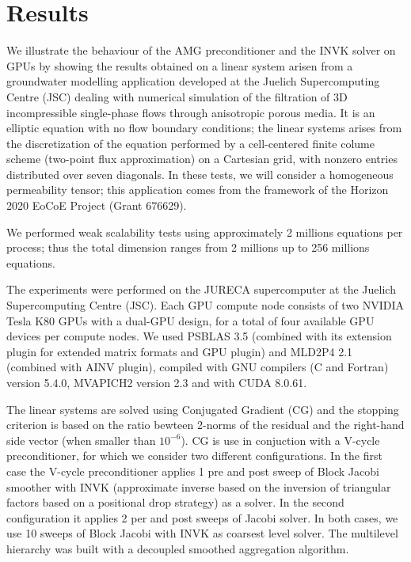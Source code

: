 \section{Results}

We illustrate the behaviour of the AMG preconditioner and the INVK
solver on GPUs  by showing the results obtained on a linear system
arisen from a groundwater modelling application developed at the
Juelich Supercomputing Centre (JSC)  dealing with numerical simulation
of the filtration of 3D incompressible single-phase flows through
anisotropic porous media. It is an elliptic equation with no flow
boundary conditions;  the linear systems arises from the discretization
of the equation performed by a cell-centered finite colume scheme
(two-point flux approximation) on a Cartesian grid, with nonzero
entries distributed over seven diagonals. In these tests, we will
consider a homogeneous permeability tensor;  this application comes
from the framework of the Horizon 2020 EoCoE Project (Grant
676629). 

We performed weak scalability tests using approximately 2 millions
equations per process; thus  the total dimension ranges from 2
millions up to 256 millions equations. 

The experiments were performed on  the JURECA supercomputer at the
Juelich Supercomputing Centre (JSC).  Each GPU compute node consists
of two NVIDIA Tesla K80 GPUs with a dual-GPU design, for a total of
four available GPU devices per compute nodes.   
We used PSBLAS 3.5 (combined with its extension plugin for extended
matrix formats and GPU plugin) and MLD2P4 2.1 (combined with AINV
plugin),  compiled with  GNU compilers (C and Fortran) version 5.4.0,
MVAPICH2 version 2.3 and with CUDA 8.0.61. 

The linear systems are solved using Conjugated Gradient (CG) and the
stopping criterion is based on the ratio bewteen 2-norms of the
residual and the right-hand side vector (when smaller than
$10^{-6}$). CG is use in conjuction with a V-cycle preconditioner, for
which we consider two different configurations. In the first case the
V-cycle 
preconditioner applies 1 pre and post sweep of Block Jacobi smoother
with INVK (approximate inverse based on the inversion of triangular
factors based on a positional drop strategy) as a solver. In the
second configuration it applies 2 per and post sweeps of Jacobi
solver. In both cases, we use 10 sweeps of Block Jacobi with INVK  as
coarsest level solver.   The multilevel hierarchy was built with a
decoupled smoothed aggregation algorithm. 

